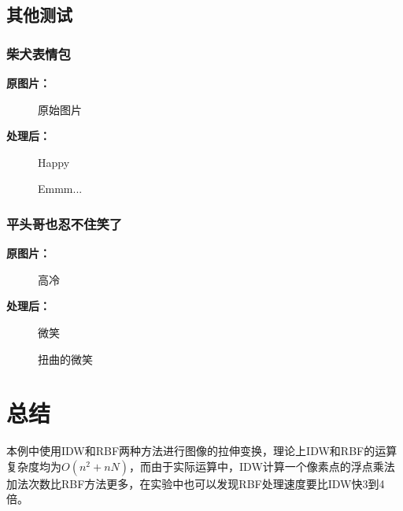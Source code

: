 \documentclass[14pt]{scrartcl} %
\begin{document}
	\subsection{其他测试}
	
	\subsubsection{柴犬表情包}
	\textbf{原图片：}
	
	\begin{figure}[h] %
		\centering
		\caption{原始图片}
	\end{figure}
	
	\pagebreak
	\textbf{处理后：}
	
	\begin{figure}[h] %
		\begin{minipage}[t]{0.5\linewidth}
			\centering
			\caption{Happy}
		\end{minipage}%
		\begin{minipage}[t]{0.5\linewidth}
			\centering
			\caption{Emmm...}
		\end{minipage}
	\end{figure}
	
	\subsubsection{平头哥也忍不住笑了}
	\textbf{原图片：}
	
	\begin{figure}[h] %
		\centering
		\caption{高冷}
	\end{figure}
	
	\pagebreak
	\textbf{处理后：}
	
	\begin{figure}[h] %
		\begin{minipage}[t]{0.5\linewidth}
			\centering
			\caption{微笑}
		\end{minipage}%
		\begin{minipage}[t]{0.5\linewidth}
			\centering
			\caption{扭曲的微笑}
		\end{minipage}
	\end{figure}
	
	\section{总结}
	本例中使用IDW和RBF两种方法进行图像的拉伸变换，理论上IDW和RBF的运算复杂度均为$O(n^2+nN)$，而由于实际运算中，IDW计算一个像素点的浮点乘法加法次数比RBF方法更多，在实验中也可以发现RBF处理速度要比IDW快3到4倍。
	
	
	
	
\end{document}
